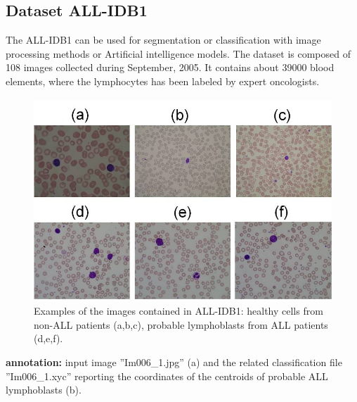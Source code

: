 \subsection{Dataset ALL-IDB1}
\hspace{\parindent}
The ALL-IDB1 can be used for segmentation or classification with image processing methods or Artificial intelligence models. The dataset is composed of 108 images collected during September, 2005. It contains about 39000 blood elements, where the lymphocytes has been labeled by expert oncologists.

\begin{figure}[H]
\centering
\includegraphics[width = 5in, height = 3in]{../images/ALLIDB1.jpg}
\caption{Examples of the images contained in ALL-IDB1: healthy cells from non-ALL patients (a,b,c), probable lymphoblasts from ALL patients (d,e,f). }
\end{figure}

\textbf{annotation:} input image ''Im006\_1.jpg'' (a) and the related classification file ''Im006\_1.xyc'' reporting the coordinates of the centroids of probable ALL lymphoblasts (b).

